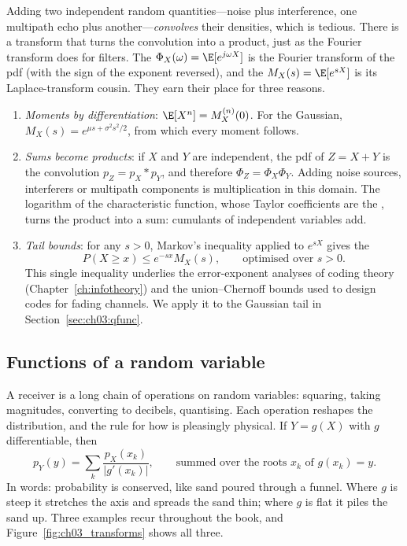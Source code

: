 Adding two independent random quantities---noise plus interference, one multipath echo plus
another---\emph{convolves} their densities, which is tedious. There is a transform that turns the
convolution into a product, just as the Fourier transform does for filters. The
 $\Phi_X(\omega)=\E[e^{j\omega X}]$ is the Fourier transform of the
pdf (with the sign of the exponent reversed), and the 
$M_X(s)=\E[e^{sX}]$ is its Laplace-transform cousin. They earn their place for three reasons.
\begin{enumerate}
\item \emph{Moments by differentiation}: $\E[X^n]=M_X^{(n)}(0)$. For the Gaussian,
$M_X(s)=e^{\mu s+\sigma^2s^2/2}$, from which every moment follows.
\item \emph{Sums become products}: if $X$ and $Y$ are independent, the pdf of $Z=X+Y$ is the
convolution $p_Z=p_X*p_Y$, and therefore $\Phi_Z=\Phi_X\Phi_Y$. Adding noise sources,
interferers or multipath components is multiplication in this domain. The logarithm of the
characteristic function, whose Taylor coefficients are the , turns the product
into a sum: cumulants of independent variables add.
\item \emph{Tail bounds}: for any $s>0$, Markov's inequality applied to $e^{sX}$ gives the
\begin{equation}
P(X\ge x)\le e^{-sx}M_X(s),\qquad\text{optimised over }s>0.
\label{eq:ch03:chernoff}
\end{equation}
This single inequality underlies the error-exponent analyses of coding theory
(Chapter~\ref{ch:infotheory}) and the union--Chernoff bounds used to design codes for fading
channels. We apply it to the Gaussian tail in Section~\ref{sec:ch03:qfunc}.
\end{enumerate}

\subsection{Functions of a random variable}

A receiver is a long chain of operations on random variables: squaring, taking magnitudes,
converting to decibels, quantising. Each operation reshapes the distribution, and the rule for how
is pleasingly physical. If $Y=g(X)$ with $g$ differentiable, then
\begin{equation}
p_Y(y)=\sum_{k}\frac{p_X(x_k)}{|g'(x_k)|},\qquad\text{summed over the roots }x_k\text{ of }g(x_k)=y .
\label{eq:ch03:transform}
\end{equation}
In words: probability is conserved, like sand poured through a funnel. Where $g$ is steep it
stretches the axis and spreads the sand thin; where $g$ is flat it piles the sand up. Three
examples recur throughout the book, and Figure~\ref{fig:ch03_transforms} shows all three.

